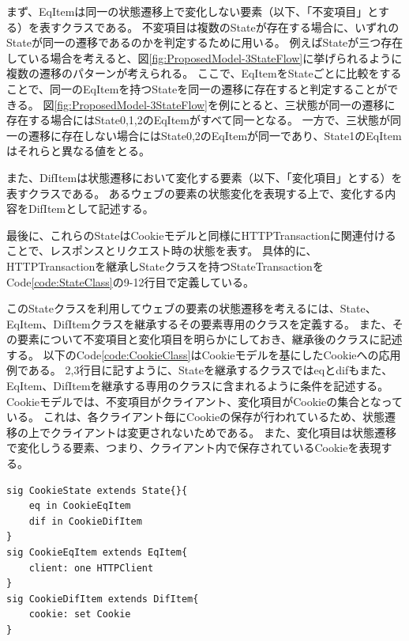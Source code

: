 \documentclass[journal]{IEEEtran}
\begin{document}
まず、EqItemは同一の状態遷移上で変化しない要素（以下、「不変項目」とする）を表すクラスである。
不変項目は複数のStateが存在する場合に、いずれのStateが同一の遷移であるのかを判定するために用いる。
例えばStateが三つ存在している場合を考えると、図\ref{fig:ProposedModel-3StateFlow}に挙げられるように複数の遷移のパターンが考えられる。
ここで、EqItemをStateごとに比較をすることで、同一のEqItemを持つStateを同一の遷移に存在すると判定することができる。
図\ref{fig:ProposedModel-3StateFlow}を例にとると、三状態が同一の遷移に存在する場合にはState0,1,2のEqItemがすべて同一となる。
一方で、三状態が同一の遷移に存在しない場合にはState0,2のEqItemが同一であり、State1のEqItemはそれらと異なる値をとる。


また、DifItemは状態遷移において変化する要素（以下、「変化項目」とする）を表すクラスである。
あるウェブの要素の状態変化を表現する上で、変化する内容をDifItemとして記述する。

最後に、これらのStateはCookieモデルと同様にHTTPTransactionに関連付けることで、レスポンスとリクエスト時の状態を表す。
具体的に、HTTPTransactionを継承しStateクラスを持つStateTransactionをCode\ref{code:StateClass}の9-12行目で定義している。

このStateクラスを利用してウェブの要素の状態遷移を考えるには、State、EqItem、DifItemクラスを継承するその要素専用のクラスを定義する。
また、その要素について不変項目と変化項目を明らかにしておき、継承後のクラスに記述する。
以下のCode\ref{code:CookieClass}はCookieモデルを基にしたCookieへの応用例である。
2,3行目に記すように、Stateを継承するクラスではeqとdifもまた、EqItem、DifItemを継承する専用のクラスに含まれるように条件を記述する。
Cookieモデルでは、不変項目がクライアント、変化項目がCookieの集合となっている。
これは、各クライアント毎にCookieの保存が行われているため、状態遷移の上でクライアントは変更されないためである。
また、変化項目は状態遷移で変化しうる要素、つまり、クライアント内で保存されているCookieを表現する。
\begin{lstlisting}[caption=Cookieへの応用例, label=code:CookieClass]
sig CookieState extends State{}{
	eq in CookieEqItem
	dif in CookieDifItem
}
sig CookieEqItem extends EqItem{
	client: one HTTPClient
}
sig CookieDifItem extends DifItem{
	cookie: set Cookie
}
\end{lstlisting}
\end{document}
